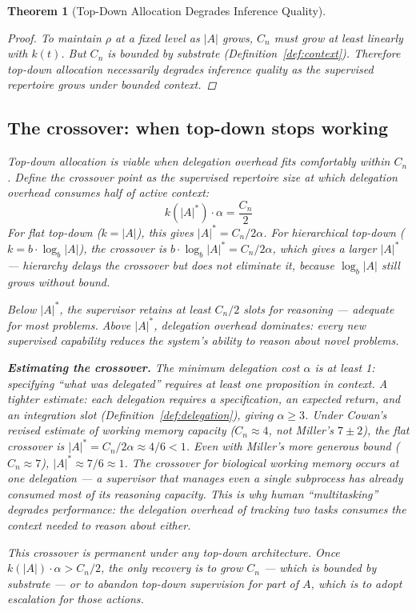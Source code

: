 \documentclass[11pt]{article}
\newtheorem{theorem}{Theorem}
\theoremstyle{definition}
\begin{document}
\begin{theorem}[Top-Down Allocation Degrades Inference Quality]
\begin{proof}
To maintain $\rho$ at a fixed level as $|A|$ grows, $C_n$ must grow
at least linearly with $k(t)$. But $C_n$
is bounded by substrate (Definition~\ref{def:context}). Therefore
top-down allocation necessarily degrades inference quality as the
supervised repertoire grows under bounded context.
\end{proof}

\subsection{The crossover: when top-down stops working}
\label{sec:crossover}

Top-down allocation is viable when delegation overhead fits comfortably
within $C_n$. Define the \emph{crossover point} as the supervised
repertoire size at which delegation overhead consumes half of active
context:
\[
k(|A|^*) \cdot \alpha = \frac{C_n}{2}
\]
For flat top-down ($k = |A|$), this gives $|A|^* = C_n / 2\alpha$. For
hierarchical top-down ($k = b \cdot \log_b |A|$), the crossover is
$b \cdot \log_b |A|^* = C_n / 2\alpha$, which gives a larger $|A|^*$
--- hierarchy delays the crossover but does not eliminate it, because
$\log_b |A|$ still grows without bound.

Below $|A|^*$, the supervisor retains at least $C_n/2$ slots for
reasoning --- adequate for most problems. Above $|A|^*$, delegation
overhead dominates: every new supervised capability \emph{reduces} the
system's ability to reason about novel problems.

\textbf{Estimating the crossover.} The minimum delegation cost $\alpha$
is at least 1: specifying ``what was delegated'' requires at least one
proposition in context. A tighter estimate: each delegation requires a
specification, an expected return, and an integration slot
(Definition~\ref{def:delegation}), giving $\alpha \geq 3$. Under
Cowan's \cite{Cowan2001} revised estimate of working memory capacity
($C_n \approx 4$, not Miller's $7 \pm 2$), the flat crossover is
$|A|^* = C_n / 2\alpha \approx 4/6 < 1$. Even with Miller's more
generous bound ($C_n \approx 7$), $|A|^* \approx 7/6 \approx 1$.
The crossover for biological working memory occurs at \emph{one
delegation} --- a supervisor that manages even a single subprocess has
already consumed most of its reasoning capacity. This is why human
``multitasking'' degrades performance: the delegation overhead of
tracking two tasks consumes the context needed to reason about
either.

This crossover is permanent under any top-down architecture. Once
$k(|A|) \cdot \alpha > C_n / 2$, the only recovery is to grow $C_n$
--- which is bounded by substrate --- or to abandon top-down
supervision for part of $A$, which is to adopt escalation for those
actions.


\end{theorem}
\end{document}
